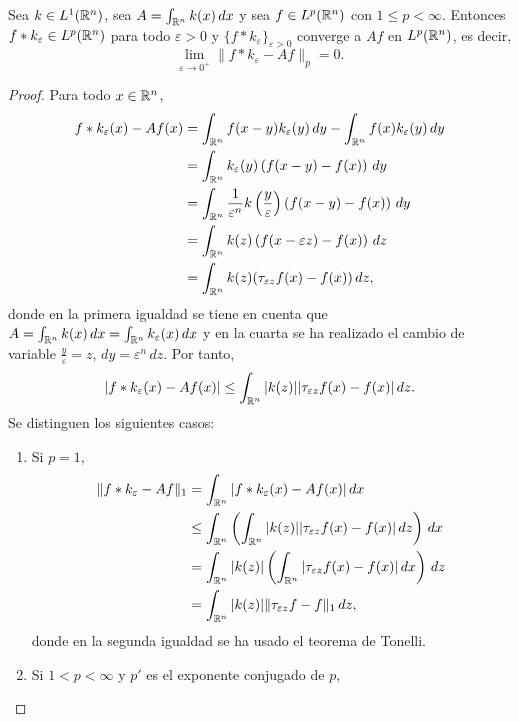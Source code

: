 \documentclass[a4paper, 11pt, oneside]{report}
\begin{document}
\begin{theorem}\label{teo:2.3.5}
  Sea $k \in L^1(\mathbb R^n)$, sea $A = \int_{\mathbb R^n} k(x) \, dx$ y sea $f \in L^p(\mathbb R^n)$ con $1 \leq p < \infty$. Entonces $f \ast k_\varepsilon \in L^p(\mathbb R^n)$ para todo $\varepsilon > 0$ y $\{f \ast k_\varepsilon\}_{\varepsilon > 0}$ converge a $Af$ en $L^p(\mathbb R^n)$, es decir,
  \[\lim_{\varepsilon \to 0^+} \|f \ast k_\varepsilon - Af\|_p = 0.\]
\end{theorem}

\begin{proof}
  Para todo $x \in \mathbb R^n$,
  \[\begin{aligned}[t]
    f \ast k_\varepsilon(x) - Af(x) &= \int_{\mathbb R^n}f(x-y) k_\varepsilon(y) \, dy - \int_{\mathbb R^n} f(x)k_\varepsilon(y) \, dy \\
    &= \int_{\mathbb R^n} k_\varepsilon(y)\left(f(x-y) - f(x)\right) \, dy \\
    &= \int_{\mathbb R^n} \frac{1}{\varepsilon^n} k\left(\frac{y}{\varepsilon}\right)\left(f(x-y)-f(x)\right) \, dy \\
    &= \int_{\mathbb R^n} k(z) \left(f(x-\varepsilon z) - f(x)\right) \, dz \\
    &= \int_{\mathbb R^n} k(z)(\tau_{\varepsilon z}f(x) - f(x)) \, dz,
  \end{aligned}\]
  donde en la primera igualdad se tiene en cuenta que $A = \int_{\mathbb R^n}k(x) \, dx = \int_{\mathbb R^n}k_\varepsilon(x) \, dx$ y en la cuarta se ha realizado el cambio de variable $\frac{y}{\varepsilon} = z$, $dy = \varepsilon^n \, dz$. Por tanto,
  \[|f \ast k_\varepsilon (x) - Af(x)| \leq \int_{\mathbb R^n} |k(z)| |\tau_{\varepsilon z}f(x) - f(x)| \, dz.\]
  Se distinguen los siguientes casos:
  \begin{enumerate}
    \item Si $p = 1$,
    \[\begin{aligned}[t]
      \|f \ast k_\varepsilon - Af\|_1 &= \int_{\mathbb R^n} |f \ast k_\varepsilon(x) - Af(x)| \, dx \\
      &\leq \int_{\mathbb R^n}\left(\int_{\mathbb R^n}|k(z)| |\tau_{\varepsilon z}f(x) - f(x)| \, dz\right) \, dx \\
      &= \int_{\mathbb R^n}|k(z)|\left(\int_{\mathbb R^n} |\tau_{\varepsilon z}f(x) - f(x)| \, dx\right) \, dz \\
      &=  \int_{\mathbb R^n}|k(z)|\|\tau_{\varepsilon z}f - f\|_1 \, dz,
    \end{aligned}\]
    donde en la segunda igualdad se ha usado el teorema de Tonelli.
    \item  Si $1 < p < \infty$ y $p'$ es el exponente conjugado de $p$,

\end{enumerate}
\end{proof}
\end{document}
